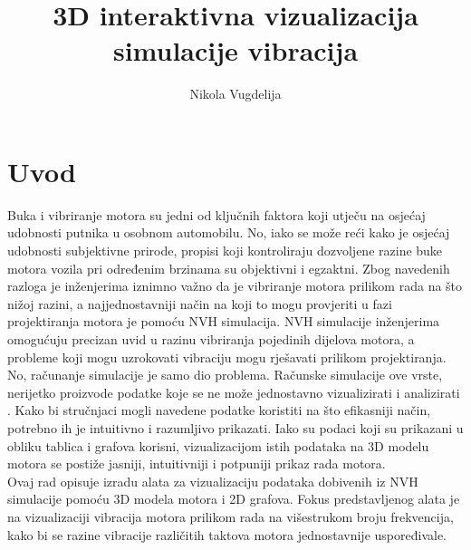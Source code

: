 \documentclass[times, utf8, diplomski]{fer}
\begin{document}

\title{3D interaktivna vizualizacija simulacije vibracija}

\author{Nikola Vugdelija}

\maketitle





\tableofcontents

\listoffigures

\chapter{Uvod}
Buka i vibriranje motora su jedni od ključnih faktora koji utječu na osjećaj udobnosti putnika u osobnom automobilu. No, iako se može reći kako je osjećaj udobnosti subjektivne prirode, propisi koji kontroliraju dozvoljene razine buke motora vozila pri određenim brzinama su objektivni i egzaktni. Zbog navedenih razloga je inženjerima iznimno važno da je vibriranje motora prilikom rada na što nižoj razini, a najjednostavniji način na koji to mogu provjeriti u fazi projektiranja motora je pomoću NVH  simulacija. NVH simulacije inženjerima omogućuju precizan uvid u razinu vibriranja pojedinih dijelova motora, a probleme koji mogu uzrokovati vibraciju mogu rješavati prilikom projektiranja.\\
No, računanje simulacije je samo dio problema. Računske simulacije ove vrste, nerijetko proizvode podatke koje se ne može jednostavno vizualizirati i analizirati \citep{matkovic2021getting}. Kako bi stručnjaci mogli navedene podatke koristiti na što efikasniji način, potrebno ih je intuitivno i razumljivo prikazati. Iako su podaci koji su prikazani u obliku tablica i grafova korisni, vizualizacijom istih podataka na 3D modelu motora se postiže jasniji, intuitivniji i potpuniji prikaz rada motora.\\
Ovaj rad opisuje izradu alata za vizualizaciju podataka dobivenih iz NVH simulacije pomoću 3D modela motora i 2D grafova. Fokus predstavljenog alata je na vizualizaciji vibracija motora prilikom rada na višestrukom broju frekvencija, kako bi se razine vibracije različitih taktova motora jednostavnije uspoređivale.
\end{document}
